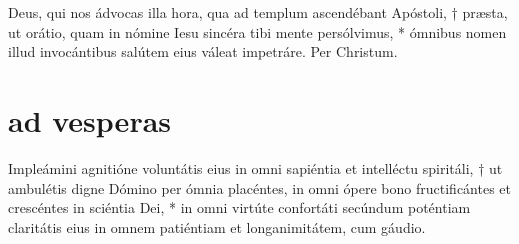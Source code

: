 Deus, qui nos ádvocas illa hora, qua ad templum ascendébant Apóstoli, † præsta, ut orátio, quam in nómine Iesu sincéra tibi mente persólvimus, *
ómnibus nomen illud invocántibus salútem eius váleat impetráre. Per Christum.\\



\section[vesperae]{ad vesperas}


\def\greinitialformat#1{{\fontsize{40}{40}\selectfont #1}}
\gresetfirstlineaboveinitial{\small \textcolor{red}{Ps 113(114)}}{}
\setaboveinitialseparation{0.72mm}

\vspace{0.6cm}


\def\greinitialformat#1{{\fontsize{40}{40}\selectfont #1}}
\gresetfirstlineaboveinitial{\small \textcolor{red}{Ps 114(115)}}{}
\setaboveinitialseparation{0.72mm}


\vspace{0.6cm}
\def\greinitialformat#1{{\fontsize{40}{40}\selectfont #1}}
\gresetfirstlineaboveinitial{\small \textcolor{red}{Ps 115/6(116/7)}}{}
\setaboveinitialseparation{0.72mm}


\vspace{0.6cm}

\def\greinitialformat#1{{\fontsize{40}{40}\selectfont #1}}
\gresetfirstlineaboveinitial{\small \textcolor{red}{Ps 128(129)}}{}
\setaboveinitialseparation{0.72mm}

\vspace{0.6cm}

Impleámini agnitióne voluntátis eius in omni sapiéntia et intelléctu spiritáli, † ut ambulétis digne Dómino per ómnia placéntes, 
in omni ópere bono fructificántes et crescéntes in sciéntia Dei, * 
in omni virtúte confortáti secúndum poténtiam claritátis eius in omnem patién­tiam et longanimitátem, cum gáudio.


